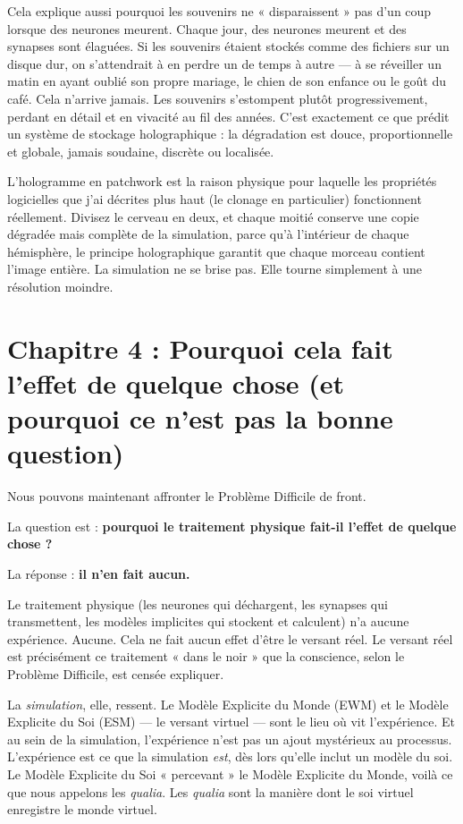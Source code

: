 \documentclass[11pt, twoside, openright]{book}
\begin{document}
Cela explique aussi pourquoi les souvenirs ne « disparaissent » pas d'un coup lorsque des neurones meurent. Chaque jour, des neurones meurent et des synapses sont élaguées. Si les souvenirs étaient stockés comme des fichiers sur un disque dur, on s'attendrait à en perdre un de temps à autre --- à se réveiller un matin en ayant oublié son propre mariage, le chien de son enfance ou le goût du café. Cela n'arrive jamais. Les souvenirs s'estompent plutôt progressivement, perdant en détail et en vivacité au fil des années. C'est exactement ce que prédit un système de stockage holographique : la dégradation est douce, proportionnelle et globale, jamais soudaine, discrète ou localisée.

L'hologramme en patchwork est la raison physique pour laquelle les propriétés logicielles que j'ai décrites plus haut (le clonage en particulier) fonctionnent réellement. Divisez le cerveau en deux, et chaque moitié conserve une copie dégradée mais complète de la simulation, parce qu'à l'intérieur de chaque hémisphère, le principe holographique garantit que chaque morceau contient l'image entière. La simulation ne se brise pas. Elle tourne simplement à une résolution moindre.


\chapter*{Chapitre 4 : Pourquoi cela fait l'effet de quelque chose (et pourquoi ce n'est pas la bonne question)}

Nous pouvons maintenant affronter le Problème Difficile de front.

La question est : \textbf{pourquoi le traitement physique fait-il l'effet de quelque chose ?}

La réponse : \textbf{il n'en fait aucun.}

Le traitement physique (les neurones qui déchargent, les synapses qui transmettent, les modèles implicites qui stockent et calculent) n'a aucune expérience. Aucune. Cela ne fait aucun effet d'être le versant réel. Le versant réel est précisément ce traitement « dans le noir » que la conscience, selon le Problème Difficile, est censée expliquer.

La \textit{simulation}, elle, ressent. Le Modèle Explicite du Monde (EWM) et le Modèle Explicite du Soi (ESM) --- le versant virtuel --- sont le lieu où vit l'expérience. Et au sein de la simulation, l'expérience n'est pas un ajout mystérieux au processus. L'expérience est ce que la simulation \textit{est}, dès lors qu'elle inclut un modèle du soi. Le Modèle Explicite du Soi « percevant » le Modèle Explicite du Monde, voilà ce que nous appelons les \textit{qualia}. Les \textit{qualia} sont la manière dont le soi virtuel enregistre le monde virtuel.
\end{document}
